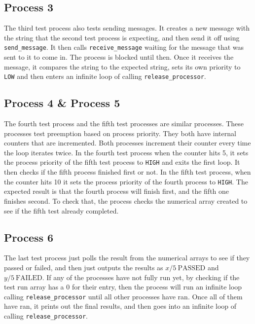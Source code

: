 \documentclass[se]{uw-wkrpt}
\begin{document}
\subsection{Process 3}

The third test process also tests sending messages. It creates a new message with the string that the second test process is expecting, and then send it off using \texttt{send\_message}. It then calls \texttt{receive\_message} waiting for the message that was sent to it to come in. The process is blocked until then. Once it receives the message, it compares the string to the expected string, sets its own priority to \texttt{LOW} and then enters an infinite loop of calling \texttt{release\_processor}.


\subsection{Process 4 \& Process 5}

The fourth test process and the fifth test processes are similar processes. These processes test preemption based on process priority. They both have internal counters that are incremented. Both processes increment their counter every time the loop iterates twice. In the fourth test process when the counter hits 5, it sets the process priority of the fifth test process to \texttt{HIGH} and exits the first loop. It then checks if the fifth process finished first or not. In the fifth test process, when the counter hits 10 it sets the process priority of the fourth process to \texttt{HIGH}. The expected result is that the fourth process will finish first, and the fifth one finishes second. To check that, the process checks the numerical array created to see if the fifth test already completed. 


\subsection{Process 6}

The last test process just polls the result from the numerical arrays to see if they passed or failed, and then just outputs the results as $x/5\ \text{PASSED}$ and $y/5\ \text{FAILED}$. If any of the processes have not fully run yet, by checking if the test run array has a $0$ for their entry, then the process will run an infinite loop calling \texttt{release\_processor} until all other processes have ran. Once all of them have ran, it prints out the final results, and then goes into an infinite loop of calling \texttt{release\_processor}.
\end{document}
